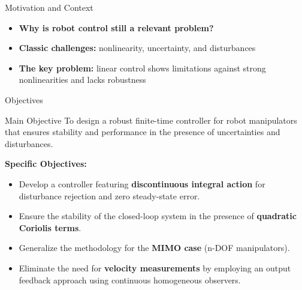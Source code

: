 \begin{frame}
    \sectionpage
\end{frame}

\begin{frame}{Motivation and Context}
    \begin{itemize}
        \item \textbf{Why is robot control still a relevant problem?}
        \item \textbf{Classic challenges:} nonlinearity, uncertainty, and disturbances
        \item \textbf{The key problem:} linear control shows limitations against strong nonlinearities and lacks robustness
    \end{itemize}
\end{frame}

\begin{frame}{Objectives}
    \begin{block}{Main Objective}
        To design a robust finite-time controller for robot manipulators that ensures stability and performance in the presence of uncertainties and disturbances.
    \end{block}
    
    \textbf{Specific Objectives:}
    \begin{itemize}
        \item Develop a controller featuring \textbf{discontinuous integral action} for disturbance rejection and zero steady-state error.
        \item Ensure the stability of the closed-loop system in the presence of \textbf{quadratic Coriolis terms}.
        \item Generalize the methodology for the \textbf{MIMO case} (n-DOF manipulators).
        \item Eliminate the need for \textbf{velocity measurements} by employing an output feedback approach using continuous homogeneous observers.
    \end{itemize}
\end{frame}